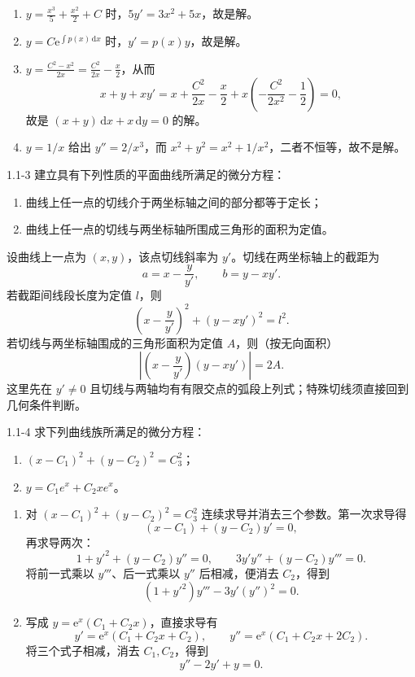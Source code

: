\documentclass[UTF8,a4paper,11pt]{ctexart}
\newcommand{\dd}{\,\mathrm d}
\newcommand{\e}{\mathrm e}
\begin{document}
\begin{solution}
\begin{enumerate}[label=(\arabic*)]
\item $y=\frac{x^3}{5}+\frac{x^2}{2}+C$ 时，$5y'=3x^2+5x$，故是解。
\item $y=C\e^{\int p(x)\dd x}$ 时，$y'=p(x)y$，故是解。
\item $y=\frac{C^2-x^2}{2x}=\frac{C^2}{2x}-\frac{x}{2}$，从而
\[
x+y+xy'=x+\frac{C^2}{2x}-\frac{x}{2}+x\left(-\frac{C^2}{2x^2}-\frac12\right)=0,
\]
故是 $(x+y)\dd x+x\dd y=0$ 的解。
\item $y=1/x$ 给出 $y''=2/x^3$，而 $x^2+y^2=x^2+1/x^2$，二者不恒等，故不是解。
\end{enumerate}
\end{solution}

\begin{problem}{1.1-3}
建立具有下列性质的平面曲线所满足的微分方程：
  \begin{enumerate}[label=(\arabic*)]
    \item 曲线上任一点的切线介于两坐标轴之间的部分都等于定长；
    \item 曲线上任一点的切线与两坐标轴所围成三角形的面积为定值。
  \end{enumerate}
\end{problem}

\begin{solution}
设曲线上一点为 $(x,y)$，该点切线斜率为 $y'$。切线在两坐标轴上的截距为
\[
a=x-\frac{y}{y'},\qquad b=y-xy'.
\]
若截距间线段长度为定值 $l$，则
\[
\boxed{\left(x-\frac{y}{y'}\right)^2+(y-xy')^2=l^2}.
\]
若切线与两坐标轴围成的三角形面积为定值 $A$，则（按无向面积）
\[
\boxed{\left|\left(x-\frac{y}{y'}\right)(y-xy')\right|=2A}.
\]
这里先在 $y'\ne0$ 且切线与两轴均有有限交点的弧段上列式；特殊切线须直接回到几何条件判断。
\end{solution}

\begin{problem}{1.1-4}
求下列曲线族所满足的微分方程：
  \begin{enumerate}[label=(\arabic*)]
    \item $\displaystyle (x-C_1)^2+(y-C_2)^2=C_3^2$；
    \item $\displaystyle y=C_1e^x+C_2xe^x$。
  \end{enumerate}
\end{problem}

\begin{solution}
\begin{enumerate}[label=(\arabic*)]
\item 对 $(x-C_1)^2+(y-C_2)^2=C_3^2$ 连续求导并消去三个参数。第一次求导得
\[
(x-C_1)+(y-C_2)y'=0,
\]
再求导两次：
\[
1+y'^2+(y-C_2)y''=0,
\qquad 3y'y''+(y-C_2)y'''=0.
\]
将前一式乘以 $y'''$、后一式乘以 $y''$ 后相减，便消去 $C_2$，得到
\[
\boxed{(1+y'^2)y'''-3y'(y'')^2=0}.
\]
\item 写成 $y=\e^x(C_1+C_2x)$，直接求导有
\[
y'=\e^x(C_1+C_2x+C_2),\qquad
y''=\e^x(C_1+C_2x+2C_2).
\]
将三个式子相减，消去 $C_1,C_2$，得到
\[
\boxed{y''-2y'+y=0}.
\]
\end{enumerate}
\end{solution}
\end{document}
